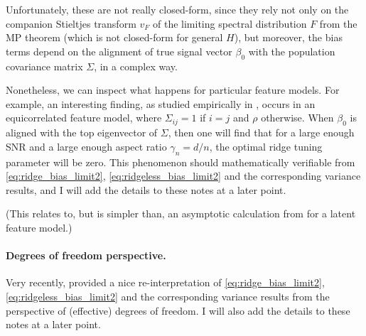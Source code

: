 \documentclass{article}
\begin{document}
Unfortunately, these are not really closed-form, since they rely not only on the
companion Stieltjes transform $v_F$ of the limiting spectral distribution $F$
from the MP theorem (which is not closed-form for general $H$), but moreover,
the bias terms depend on the alignment of true signal vector $\beta_0$ with the
population covariance matrix $\Sigma$, in a complex way.  

Nonetheless, we can inspect what happens for particular feature models. For
example, an interesting finding, as studied empirically in
\citet{kobak2020optimal}, occurs in an equicorrelated feature model, where
$\Sigma_{ij} = 1$ if $i=j$ and $\rho$ otherwise. When $\beta_0$ is aligned with  
the top eigenvector of $\Sigma$, then one will find that for a large enough SNR 
and a large enough aspect ratio $\gamma_n = d/n$, the optimal ridge tuning
parameter will be zero. This phenomenon should mathematically verifiable from  
\eqref{eq:ridge_bias_limit2}, \eqref{eq:ridgeless_bias_limit2} and the
corresponding variance results, and I will add the details to these notes at a
later point.   

(This relates to, but is simpler than, an asymptotic calculation from
\citet{hastie2022surprises} for a latent feature model.) 

\paragraph{Degrees of freedom perspective.}

Very recently, \citet{bach2023high} provided a nice re-interpretation of
\eqref{eq:ridge_bias_limit2}, \eqref{eq:ridgeless_bias_limit2} and the
corresponding variance results from the perspective of (effective) degrees of
freedom. I will also add the details to these notes at a later point. 



\end{document}
